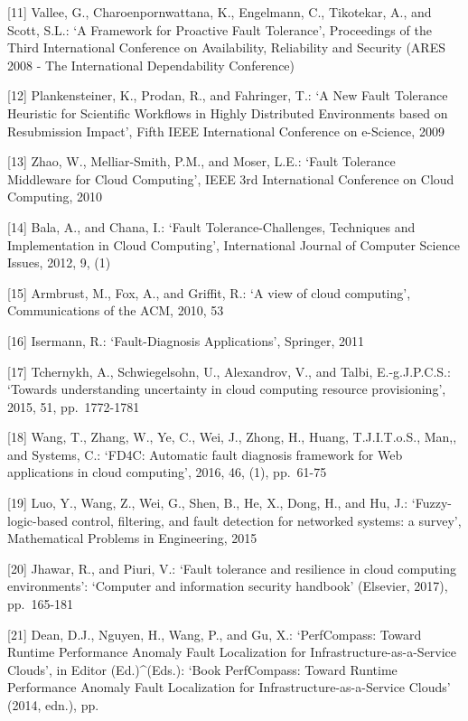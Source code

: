 \documentclass[
  vietnamese,
]{article}
\begin{document}
{[}11{]} Vallee, G., Charoenpornwattana, K., Engelmann, C., Tikotekar,
A., and Scott, S.L.: `A Framework for Proactive Fault Tolerance',
Proceedings of the Third International Conference on Availability,
Reliability and Security (ARES 2008 - The International Dependability
Conference)

{[}12{]} Plankensteiner, K., Prodan, R., and Fahringer, T.: `A New Fault
Tolerance Heuristic for Scientific Workflows in Highly Distributed
Environments based on Resubmission Impact', Fifth IEEE International
Conference on e-Science, 2009

{[}13{]} Zhao, W., Melliar-Smith, P.M., and Moser, L.E.: `Fault
Tolerance Middleware for Cloud Computing', IEEE 3rd International
Conference on Cloud Computing, 2010

{[}14{]} Bala, A., and Chana, I.: `Fault Tolerance-Challenges,
Techniques and Implementation in Cloud Computing', International Journal
of Computer Science Issues, 2012, 9, (1)

{[}15{]} Armbrust, M., Fox, A., and Griffit, R.: `A view of cloud
computing', Communications of the ACM, 2010, 53

{[}16{]} Isermann, R.: `Fault-Diagnosis Applications', Springer, 2011

{[}17{]} Tchernykh, A., Schwiegelsohn, U., Alexandrov, V., and Talbi,
E.-g.J.P.C.S.: `Towards understanding uncertainty in cloud computing
resource provisioning', 2015, 51, pp.~1772-1781

{[}18{]} Wang, T., Zhang, W., Ye, C., Wei, J., Zhong, H., Huang,
T.J.I.T.o.S., Man,, and Systems, C.: `FD4C: Automatic fault diagnosis
framework for Web applications in cloud computing', 2016, 46, (1),
pp.~61-75

{[}19{]} Luo, Y., Wang, Z., Wei, G., Shen, B., He, X., Dong, H., and Hu,
J.: `Fuzzy-logic-based control, filtering, and fault detection for
networked systems: a survey', Mathematical Problems in Engineering, 2015

{[}20{]} Jhawar, R., and Piuri, V.: `Fault tolerance and resilience in
cloud computing environments': `Computer and information security
handbook' (Elsevier, 2017), pp.~165-181

{[}21{]} Dean, D.J., Nguyen, H., Wang, P., and Gu, X.: `PerfCompass:
Toward Runtime Performance Anomaly Fault Localization for
Infrastructure-as-a-Service Clouds', in Editor (Ed.)\^{}(Eds.): `Book
PerfCompass: Toward Runtime Performance Anomaly Fault Localization for
Infrastructure-as-a-Service Clouds' (2014, edn.), pp.
\end{document}
